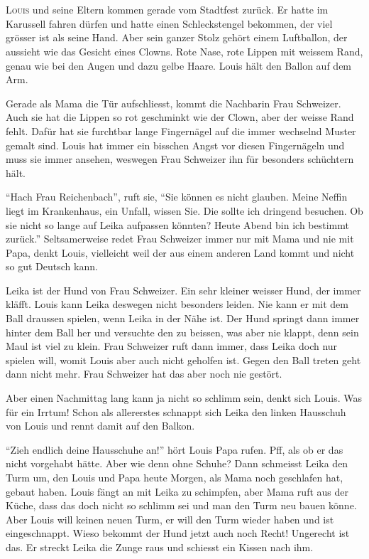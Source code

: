 \chapter*{}
\lettrine[lines=3]{\color{DeepPink}L}{ouis} und seine Eltern kommen gerade vom Stadtfest zurück. Er hatte im Karussell fahren dürfen und hatte einen Schleckstengel bekommen, der viel grösser ist als seine Hand. Aber sein ganzer Stolz gehört einem Luftballon, der aussieht wie das Gesicht eines Clowns. Rote Nase, rote Lippen mit weissem Rand, genau wie bei den Augen und dazu gelbe Haare. Louis hält den Ballon auf dem Arm.

Gerade als Mama die Tür aufschliesst, kommt die Nachbarin Frau Schweizer. Auch sie hat die Lippen so rot geschminkt wie der Clown, aber der weisse Rand fehlt. Dafür hat sie furchtbar lange Fingernägel auf die immer wechselnd Muster gemalt sind. Louis hat immer ein bisschen Angst vor diesen Fingernägeln und muss sie immer ansehen, weswegen Frau Schweizer ihn für besonders schüchtern hält.

\enquote{Hach Frau Reichenbach}, ruft sie, \enquote{Sie können es nicht glauben. Meine Neffin liegt im Krankenhaus, ein Unfall, wissen Sie. Die sollte ich dringend besuchen. Ob sie nicht so lange auf Leika aufpassen könnten? Heute Abend bin ich bestimmt zurück.} Seltsamerweise redet Frau Schweizer immer nur mit Mama und nie mit Papa, denkt Louis, vielleicht weil der aus einem anderen Land kommt und nicht so gut Deutsch kann.

Leika ist der Hund von Frau Schweizer. Ein sehr kleiner weisser Hund, der immer kläfft. Louis kann Leika deswegen nicht besonders leiden. Nie kann er mit dem Ball draussen spielen, wenn Leika in der Nähe ist. Der Hund springt dann immer hinter dem Ball her und versuchte den zu beissen, was aber nie klappt, denn sein Maul ist viel zu klein. Frau Schweizer ruft dann immer, dass Leika doch nur spielen will, womit Louis aber auch nicht geholfen ist. Gegen den Ball treten geht dann nicht mehr. Frau Schweizer hat das aber noch nie gestört.

Aber einen Nachmittag lang kann ja nicht so schlimm sein, denkt sich Louis. Was für ein Irrtum! Schon als allererstes schnappt sich Leika den linken Hausschuh von Louis und rennt damit auf den Balkon.

\enquote{Zieh endlich deine Hausschuhe an!} hört Louis Papa rufen. Pff, als ob er das nicht vorgehabt hätte. Aber wie denn ohne Schuhe? Dann schmeisst Leika den Turm um, den Louis und Papa heute Morgen, als Mama noch geschlafen hat, gebaut haben. Louis fängt an mit Leika zu schimpfen, aber Mama ruft aus der Küche, dass das doch nicht so schlimm sei und man den Turm neu bauen könne. Aber Louis will keinen neuen Turm, er will den Turm wieder haben und ist eingeschnappt. Wieso bekommt der Hund jetzt auch noch Recht! Ungerecht ist das. Er streckt Leika die Zunge raus und schiesst ein Kissen nach ihm.

